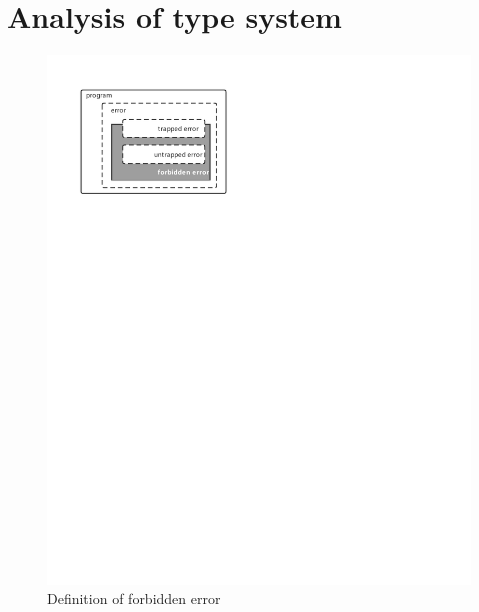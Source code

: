 \section{Analysis of type system}

\begin{figure}[htbp]
    \centerline{\includegraphics[scale=0.8]{figures/type-definition}}
    \caption{Definition of forbidden error}
    \label{fig:type-definition}
\end{figure}


